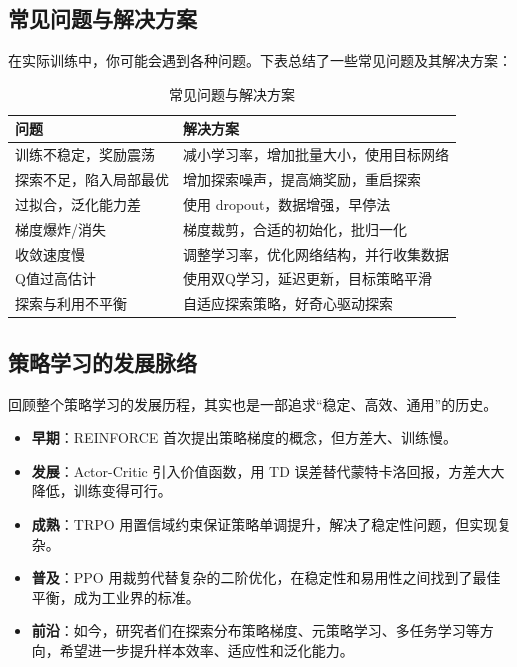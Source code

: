\documentclass[lang=cn,zihao=-4,a4paper,fontset=windows]{beautybook}
\begin{document}
\subsection{常见问题与解决方案}

在实际训练中，你可能会遇到各种问题。下表总结了一些常见问题及其解决方案：

\begin{table}[H]
\centering
\caption{常见问题与解决方案}
\begin{tabular}{p{}p{}}
\toprule
\textbf{问题} & \textbf{解决方案} \\
\midrule
训练不稳定，奖励震荡 & 减小学习率，增加批量大小，使用目标网络 \\
探索不足，陷入局部最优 & 增加探索噪声，提高熵奖励，重启探索 \\
过拟合，泛化能力差 & 使用 dropout，数据增强，早停法 \\
梯度爆炸/消失 & 梯度裁剪，合适的初始化，批归一化 \\
收敛速度慢 & 调整学习率，优化网络结构，并行收集数据 \\
Q值过高估计 & 使用双Q学习，延迟更新，目标策略平滑 \\
探索与利用不平衡 & 自适应探索策略，好奇心驱动探索 \\
\bottomrule
\end{tabular}
\end{table}

\subsection{策略学习的发展脉络}

回顾整个策略学习的发展历程，其实也是一部追求“稳定、高效、通用”的历史。

\begin{itemize}
    \item \textbf{早期}：REINFORCE 首次提出策略梯度的概念，但方差大、训练慢。
    \item \textbf{发展}：Actor-Critic 引入价值函数，用 TD 误差替代蒙特卡洛回报，方差大大降低，训练变得可行。
    \item \textbf{成熟}：TRPO 用置信域约束保证策略单调提升，解决了稳定性问题，但实现复杂。
    \item \textbf{普及}：PPO 用裁剪代替复杂的二阶优化，在稳定性和易用性之间找到了最佳平衡，成为工业界的标准。
    \item \textbf{前沿}：如今，研究者们在探索分布策略梯度、元策略学习、多任务学习等方向，希望进一步提升样本效率、适应性和泛化能力。
\end{itemize}
\end{document}
